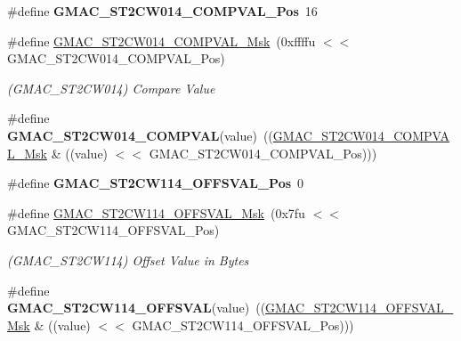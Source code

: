 \begin{DoxyCompactItemize}
\item 
\mbox{\label{group__SAMV71__GMAC_ga236259e6c94eef841c4d7989124b410f}} 
\#define {\bfseries G\+M\+A\+C\+\_\+\+S\+T2\+C\+W014\+\_\+\+C\+O\+M\+P\+V\+A\+L\+\_\+\+Pos}~16
\item 
\mbox{\label{group__SAMV71__GMAC_ga913a5a1ffeb8b4a75b5839e6b593b79c}} 
\#define \mbox{\hyperlink{group__SAMV71__GMAC_ga913a5a1ffeb8b4a75b5839e6b593b79c}{G\+M\+A\+C\+\_\+\+S\+T2\+C\+W014\+\_\+\+C\+O\+M\+P\+V\+A\+L\+\_\+\+Msk}}~(0xffffu $<$$<$ G\+M\+A\+C\+\_\+\+S\+T2\+C\+W014\+\_\+\+C\+O\+M\+P\+V\+A\+L\+\_\+\+Pos)
\begin{DoxyCompactList}\small\item\em (G\+M\+A\+C\+\_\+\+S\+T2\+C\+W014) Compare Value \end{DoxyCompactList}\item 
\mbox{\label{group__SAMV71__GMAC_ga8869d86006cf1463d8b89a93e33cb5ad}} 
\#define {\bfseries G\+M\+A\+C\+\_\+\+S\+T2\+C\+W014\+\_\+\+C\+O\+M\+P\+V\+AL}(value)~((\mbox{\hyperlink{group__SAMV71__GMAC_ga913a5a1ffeb8b4a75b5839e6b593b79c}{G\+M\+A\+C\+\_\+\+S\+T2\+C\+W014\+\_\+\+C\+O\+M\+P\+V\+A\+L\+\_\+\+Msk}} \& ((value) $<$$<$ G\+M\+A\+C\+\_\+\+S\+T2\+C\+W014\+\_\+\+C\+O\+M\+P\+V\+A\+L\+\_\+\+Pos)))
\item 
\mbox{\label{group__SAMV71__GMAC_ga6c2abe9d96e3e202f010911c71a17f2d}} 
\#define {\bfseries G\+M\+A\+C\+\_\+\+S\+T2\+C\+W114\+\_\+\+O\+F\+F\+S\+V\+A\+L\+\_\+\+Pos}~0
\item 
\mbox{\label{group__SAMV71__GMAC_ga2ffa03caa370aef57a44a86255c453f7}} 
\#define \mbox{\hyperlink{group__SAMV71__GMAC_ga2ffa03caa370aef57a44a86255c453f7}{G\+M\+A\+C\+\_\+\+S\+T2\+C\+W114\+\_\+\+O\+F\+F\+S\+V\+A\+L\+\_\+\+Msk}}~(0x7fu $<$$<$ G\+M\+A\+C\+\_\+\+S\+T2\+C\+W114\+\_\+\+O\+F\+F\+S\+V\+A\+L\+\_\+\+Pos)
\begin{DoxyCompactList}\small\item\em (G\+M\+A\+C\+\_\+\+S\+T2\+C\+W114) Offset Value in Bytes \end{DoxyCompactList}\item 
\mbox{\label{group__SAMV71__GMAC_gabd4720e1e0ab74092611717ff3c27256}} 
\#define {\bfseries G\+M\+A\+C\+\_\+\+S\+T2\+C\+W114\+\_\+\+O\+F\+F\+S\+V\+AL}(value)~((\mbox{\hyperlink{group__SAMV71__GMAC_ga2ffa03caa370aef57a44a86255c453f7}{G\+M\+A\+C\+\_\+\+S\+T2\+C\+W114\+\_\+\+O\+F\+F\+S\+V\+A\+L\+\_\+\+Msk}} \& ((value) $<$$<$ G\+M\+A\+C\+\_\+\+S\+T2\+C\+W114\+\_\+\+O\+F\+F\+S\+V\+A\+L\+\_\+\+Pos)))

\end{DoxyCompactItemize}
